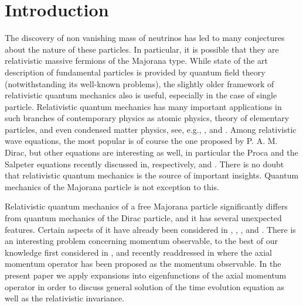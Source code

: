 \documentclass[12pt]{article}
\begin{document}
\section{ Introduction}
The discovery  of non vanishing mass of neutrinos has led to many conjectures about the nature of these particles.  In particular,  it  is possible that they are  relativistic massive fermions of the Majorana type.  While  state of the art description of fundamental particles is provided by quantum field theory  (notwithstanding its well-known problems),  the slightly older framework of relativistic quantum mechanics  also is useful,  especially in the case of  single particle.  
Relativistic quantum mechanics  has  many important  applications in such branches of contemporary physics  as atomic physics, theory of elementary particles, and even condensed matter physics, see, e.g.,   \cite{1}, \cite{2} and \cite{3}. Among  relativistic wave equations, the most popular is of course the one proposed by P. A. M.  Dirac, but other equations are interesting  as well,  in particular  the Proca   and the  Salpeter equations recently discussed in, respectively,  \cite{4} and \cite{5}.  There is no doubt that  relativistic quantum mechanics is the source of important insights.  Quantum mechanics of the Majorana particle is not  exception to this.  


Relativistic  quantum mechanics of a free Majorana particle  significantly differs from quantum mechanics of the Dirac particle,  and  it has several unexpected features.  Certain aspects of it  have already been considered in \cite{6}, \cite{7},  \cite{8},  \cite{9} and \cite{10}. There is an interesting problem concerning  momentum observable, to the best of our knowledge first considered in \cite{7}, and  recently readdressed  in \cite{10} where the axial momentum  operator has been proposed as the momentum observable.     In the present paper  we  apply  expansions into eigenfunctions of the axial momentum operator in order to discuss general solution of the  time evolution equation  as well as the relativistic invariance.  
\end{document}
